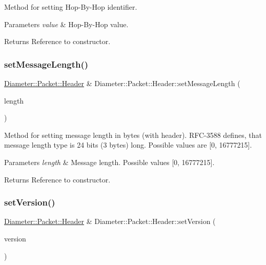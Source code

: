 Method for setting Hop-\/\+By-\/\+Hop identifier. 


\begin{DoxyParams}{Parameters}
{\em value} & Hop-\/\+By-\/\+Hop value. \\
\hline
\end{DoxyParams}
\begin{DoxyReturn}{Returns}
Reference to constructor. 
\end{DoxyReturn}
\mbox{\label{classDiameter_1_1Packet_1_1Header_adb3f6fe659428c7054218fdbb49b1850}} 
\subsubsection{\texorpdfstring{set\+Message\+Length()}{setMessageLength()}}
{\footnotesize\ttfamily \hyperlink{classDiameter_1_1Packet_1_1Header}{Diameter\+::\+Packet\+::\+Header} \& Diameter\+::\+Packet\+::\+Header\+::set\+Message\+Length (\begin{DoxyParamCaption}\item[{Message\+Length\+Type}]{length }\end{DoxyParamCaption})}



Method for setting message length in bytes (with header). R\+F\+C-\/3588 defines, that message length type is 24 bits (3 bytes) long. Possible values are \mbox{[}0, 16777215\mbox{]}. 


\begin{DoxyParams}{Parameters}
{\em length} & Message length. Possible values \mbox{[}0, 16777215\mbox{]}. \\
\hline
\end{DoxyParams}
\begin{DoxyReturn}{Returns}
Reference to constructor. 
\end{DoxyReturn}
\mbox{\label{classDiameter_1_1Packet_1_1Header_a0da1ec23a71eabc974ae21386ee154de}} 
\subsubsection{\texorpdfstring{set\+Version()}{setVersion()}}
{\footnotesize\ttfamily \hyperlink{classDiameter_1_1Packet_1_1Header}{Diameter\+::\+Packet\+::\+Header} \& Diameter\+::\+Packet\+::\+Header\+::set\+Version (\begin{DoxyParamCaption}\item[{Version\+Type}]{version }\end{DoxyParamCaption})}



